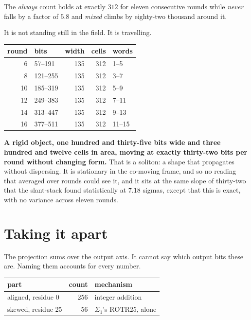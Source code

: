 The \emph{always} count holds at exactly \(312\) for eleven consecutive rounds while \emph{never}
falls by a factor of \(5.8\) and \emph{mixed} climbs by eighty-two thousand around it.

It is not standing still in the field. It is travelling.

\begin{center}
\begin{tabular}{rlrrl}
\toprule
round & bits & width & cells & words \\
\midrule
6 & 57--191 & 135 & 312 & 1--5 \\
8 & 121--255 & 135 & 312 & 3--7 \\
10 & 185--319 & 135 & 312 & 5--9 \\
12 & 249--383 & 135 & 312 & 7--11 \\
14 & 313--447 & 135 & 312 & 9--13 \\
16 & 377--511 & 135 & 312 & 11--15 \\
\bottomrule
\end{tabular}
\end{center}

\textbf{A rigid object, one hundred and thirty-five bits wide and three hundred and twelve cells in
area, moving at exactly thirty-two bits per round without changing form.} That is a soliton: a shape
that propagates without dispersing. It is stationary in the co-moving frame, and so no reading
that averaged over rounds could see it, and it sits at the same slope of thirty-two that the
slant-stack found statistically at \(7.18\) sigmas, except that this is exact, with no variance
across eleven rounds.

\section{Taking it apart}

The projection sums over the output axis. It cannot say which output bits these are. Naming them
accounts for every number.

\begin{center}
\begin{tabular}{lrl}
\toprule
part & count & mechanism \\
\midrule
aligned, residue 0 & 256 & integer addition \\
skewed, residue 25 & 56 & \(\Sigma_1\)'s \(\mathrm{ROTR}25\), alone \\
\bottomrule
\end{tabular}
\end{center}

